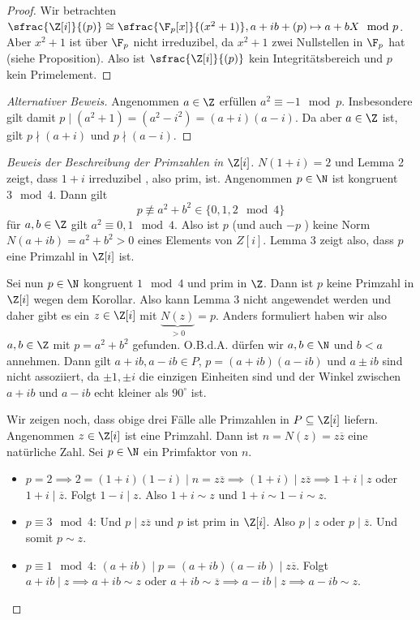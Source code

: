 \begin{proof}
	Wir betrachten $\sfrac{\Z[i]}{(p)} \cong \sfrac{\F_{p}[x]}{(x^2+1)}, a+ib + (p) \mapsto a+b X \mod p$.
	Aber $x^2 +1$ ist über $\F_{p}$ nicht irreduzibel, da $x^2 +1$ zwei Nullstellen in $\F_{p}$ hat (siehe Proposition).
	Also ist $\sfrac{\Z[i]}{(p)}$ kein Integritätsbereich und $p$ kein Primelement.
\end{proof}

\begin{proof}[Alternativer Beweis]
	Angenommen $a \in \Z$ erfüllen $a^2 \equiv -1 \mod p$.
	Insbesondere gilt damit $p \mid (a^2 +1) = (a^2 - i^2) = (a+i)(a-i)$.
	Da aber $a \in \Z$ ist, gilt $p \nmid (a+i)$ und $p \nmid (a-i)$.
\end{proof}

\begin{proof}[Beweis der Beschreibung der Primzahlen in ${\Z[i]}$]
	$N(1+i) = 2$ und Lemma 2 zeigt, dass $1+i$ irreduzibel , also prim, ist.
	Angenommen $p \in \N$ ist kongruent $3 \mod 4$. Dann gilt 
	\[
		p \not\equiv a^2 + b^2 \in \{0,1,2 \mod 4\} 
	\]
	für $a,b \in \Z$ gilt $a^2 \equiv 0,1 \mod 4$.
	Also ist $p$ (und auch $-p$ ) keine Norm $N(a+ib) = a^2 + b^2 > 0$ eines Elements von $Z[i]$.
	Lemma 3 zeigt also, dass $p$ eine Primzahl in $\Z[i]$ ist.

	Sei nun $p \in \N$ kongruent $1 \mod 4$ und prim in $\Z$. 
	Dann ist $p$ keine Primzahl in $\Z[i]$ wegen dem Korollar.
	Also kann Lemma  3 nicht angewendet werden und daher gibt es ein $z \in \Z[i]$ mit $\underbrace{N(z)}_{> 0} = p$.
	Anders formuliert haben wir also $a,b \in \Z$ mit $p = a^2 + b^2$ gefunden.
	O.B.d.A. dürfen wir $a,b \in \N$ und $b<a$ annehmen.
	Dann gilt $a+ib, a-ib \in P$, $p = (a+ib)(a-ib)$ und $a \pm ib$ sind nicht assoziiert, da $\pm 1, \pm i$ die einzigen Einheiten sind
	und der Winkel zwischen $a+ib$ und $a-ib$ echt kleiner als $90^{\circ}$ ist.

	Wir zeigen noch, dass obige drei Fälle alle Primzahlen in $P \subseteq \Z[i]$ liefern.
	Angenommen $z \in \Z[i]$ ist eine Primzahl.
	Dann ist $n = N(z) = z \overline{z}$ eine natürliche Zahl.
	Sei $p \in \N$ ein Primfaktor von $n$.
	\begin{itemize}
		\item $p = 2 \implies 2 = (1+i)(1-i) \mid n = z \overline{z} \implies (1+i) \mid z \overline{z} \implies 1+i \mid z$ oder $1+i \mid \overline{z}$.
			Folgt $1-i \mid z$. Also $1+i \sim z$ und  $1+i \sim 1-i \sim z$.
		\item  $p \equiv 3 \mod 4$: Und  $p \mid z \overline{z}$ und $p$ ist prim in $\Z[i]$.
			Also $p \mid z$ oder $p \mid \overline{z}$. Und somit $p \sim z$.
		\item  $p \equiv 1 \mod 4$: $(a+ib) \mid p = (a+ib)(a-ib) \mid z \overline{z}$. Folgt
			$a+ib \mid z \implies a+ib \sim z$  oder $a+ib \sim \overline{z} \implies a-ib \mid z \implies a-ib \sim z$.
	\end{itemize} 
\end{proof}

